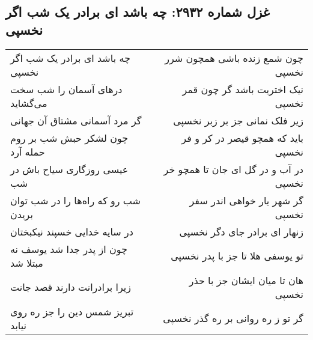\begin{center}
\section*{غزل شماره ۲۹۳۲: چه باشد ای برادر یک شب اگر نخسپی}
\label{sec:2932}
\begin{longtable}{l p{0.5cm} r}
چه باشد ای برادر یک شب اگر نخسپی
&&
چون شمع زنده باشی همچون شرر نخسپی
\\
درهای آسمان را شب سخت می‌گشاید
&&
نیک اختریت باشد گر چون قمر نخسپی
\\
گر مرد آسمانی مشتاق آن جهانی
&&
زیر فلک نمانی جز بر زبر نخسپی
\\
چون لشکر حبش شب بر روم حمله آرد
&&
باید که همچو قیصر در کر و فر نخسپی
\\
عیسی روزگاری سیاح باش در شب
&&
در آب و در گل ای جان تا همچو خر نخسپی
\\
شب رو که راه‌ها را در شب توان بریدن
&&
گر شهر یار خواهی اندر سفر نخسپی
\\
در سایه خدایی خسپند نیکبختان
&&
زنهار ای برادر جای دگر نخسپی
\\
چون از پدر جدا شد یوسف نه مبتلا شد
&&
تو یوسفی هلا تا جز با پدر نخسپی
\\
زیرا برادرانت دارند قصد جانت
&&
هان تا میان ایشان جز با حذر نخسپی
\\
تبریز شمس دین را جز ره روی نیابد
&&
گر تو ز ره روانی بر ره گذر نخسپی
\\
\end{longtable}
\end{center}
